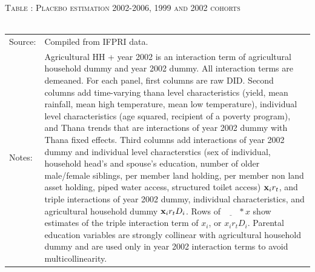 \documentclass[12pt,letterpaper]{article}
\newcommand{\bfx}{\ensuremath{\mbox{\bf x}}}
\newcommand{\0}{\ensuremath{\mbox{\boldmath $0$}}}
\begin{document}
\begin{table}\hfil\textsc{\footnotesize Table \thetable: Placebo estimation 2002-2006, 1999 and 2002 cohorts\label{Placebo10}}\\\setlength{\tabcolsep}{.5pt}\renewcommand{\arraystretch}{.675}\hspace{-2em}\hfil\\\renewcommand{\arraystretch}{1}\hfil\begin{tabular}{>{\hfill\scriptsize}p{1cm}<{}>{\scriptsize}p{12cm}<{\hfill}} Source:& Compiled from IFPRI data. \\[-1ex] Notes:&   \textsf{Agricultural HH + year 2002} is an interaction term of agricultural household dummy and year 2002 dummy. All interaction terms are demeaned. For each panel, first columns are raw DID. Second columns add time-varying thana level characteristics (yield, mean rainfall, mean high temperature, mean low temperature), individual level characteristics (age squared, recipient of a poverty program), and \textsf{Thana trends} that are interactions of year 2002 dummy with Thana fixed effects. Third columns add interactions of year 2002 dummy and individual level characterstics (sex of individual, household head's and spouse's education, number of older male/female siblings, per member land holding, per member non land asset holding, piped water access, structured toilet access) $\bfx_{i}r_{t}$, and triple interactions of year 2002 dummy, individual characteristics, and agricultural household dummy $\bfx_{i}r_{t}D_{i}$. Rows of $\underline{\phantom{mm}}*x$ show estimates of the triple interaction term of $x_{i}$, or $x_{i}r_{t}D_{i}$. Parental education variables are strongly collinear with agricultural household dummy and are used only in year 2002 interaction terms to avoid multicollinearity.   \end{tabular} \end{table}
\end{document}
